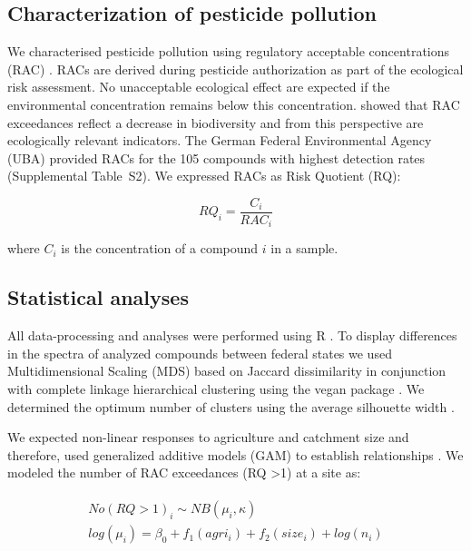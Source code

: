 \documentclass[journal=esthag,manuscript=article]{achemso}
\begin{document}
\subsection{Characterization of pesticide pollution}
We characterised pesticide pollution using regulatory acceptable concentrations (RAC) \citep{brock_linking_2010}.
RACs are derived during pesticide authorization as part of the ecological risk assessment.
No unacceptable ecological effect are expected if the environmental concentration remains below this concentration.
\citet{stehle_pesticide_2015} showed that RAC exceedances reflect a decrease in biodiversity and from this perspective are ecologically relevant indicators. 
The German Federal Environmental Agency (UBA) provided RACs for the 105 compounds with highest detection rates (Supplemental Table~S2). 
We expressed RACs as Risk Quotient (RQ):

\begin{equation}
RQ_i = \frac{C_i}{RAC_i}
\end{equation}

where $C_i$ is the concentration of a compound $i$ in a sample.


\subsection{Statistical analyses}
All data-processing and analyses were performed using R \citep{r_core_team_r:_2016}.
To display differences in the spectra of analyzed compounds between federal states we used Multidimensional Scaling (MDS) based on Jaccard dissimilarity in conjunction with complete linkage hierarchical clustering using the vegan package \citep{oksanen_vegan:_2016}.
We determined the optimum number of clusters using the average silhouette width \citep{rousseeuw1987silhouettes}. 

We expected non-linear responses to agriculture and catchment size and therefore, used generalized additive models (GAM) to establish relationships \citep{fewster_analysis_2000}.
We modeled the number of RAC exceedances (RQ \textgreater 1) at a site as:

\begin{align}
\begin{split}
  No(RQ > 1)_i \sim NB(\mu_i, \kappa) \\
  log(\mu_i)= \beta_0 + f_1(agri_i) + f_2(size_i) + log(n_i) \\
\end{split}
\end{align}
\end{document}
